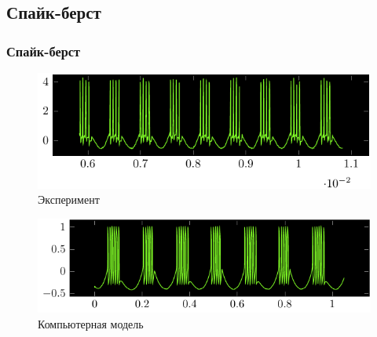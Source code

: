 \subsection{Спайк-берст}
\begin{frame}%
	\frametitle{Спайк-берст}
	\begin{figure}[h]
		\hspace{-1.3em}
		\centering
		\includegraphics[]{img/berst}
		\vspace{-1.5em}
		\caption{Эксперимент}
	\end{figure}
	\begin{figure}[h]
		\hspace{-2em}
		\centering
		\includegraphics[]{img/berst_matlab}
		\caption{Компьютерная модель}
	\end{figure}	
\end{frame}
